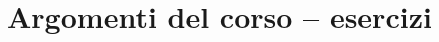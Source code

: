 \documentclass[11pt,fleqn]{book} %
\begin{document}
% 


\pagestyle{empty} %

% 

\pagestyle{fancy} %

\dominitoc[n]
\tableofcontents





\clearpage
\newpage
\newpage


\clearpage
\newpage
\newpage


\clearpage
\newpage

\appendix

\chapter{Argomenti del corso -- esercizi}\label{ch:argomenti}

\end{document}
